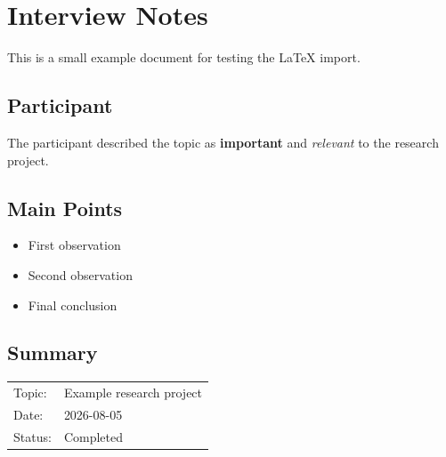 \documentclass{article}
\begin{document}
\section{Interview Notes}

This is a small example document for testing the LaTeX import.

\subsection{Participant}

The participant described the topic as \textbf{important} and
\emph{relevant} to the research project.

\subsection{Main Points}

\begin{itemize}
    \item First observation
    \item Second observation
    \item Final conclusion
\end{itemize}

\subsection{Summary}

\begin{tabular}{ll}
Topic: & Example research project \\
Date: & 2026-08-05 \\
Status: & Completed
\end{tabular}
\end{document}
